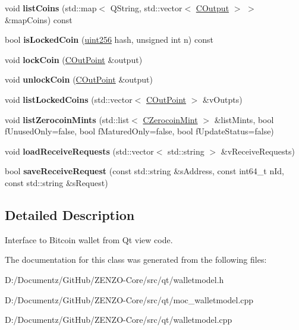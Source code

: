 \begin{DoxyCompactItemize}
void {\bfseries list\+Coins} (std\+::map$<$ Q\+String, std\+::vector$<$ \mbox{\hyperlink{class_c_output}{C\+Output}} $>$ $>$ \&map\+Coins) const
\item 
\mbox{\label{class_wallet_model_abeea7ae42ec38ace2786b2e3d340f5a2}} 
bool {\bfseries is\+Locked\+Coin} (\mbox{\hyperlink{classuint256}{uint256}} hash, unsigned int n) const
\item 
\mbox{\label{class_wallet_model_a9bb6c954dc3cf27e25ced65375fa02f0}} 
void {\bfseries lock\+Coin} (\mbox{\hyperlink{class_c_out_point}{C\+Out\+Point}} \&output)
\item 
\mbox{\label{class_wallet_model_a0a5514bd400327df0f7d63341d8fabf4}} 
void {\bfseries unlock\+Coin} (\mbox{\hyperlink{class_c_out_point}{C\+Out\+Point}} \&output)
\item 
\mbox{\label{class_wallet_model_a367977352d1ef183ec2cb6b508a85bc2}} 
void {\bfseries list\+Locked\+Coins} (std\+::vector$<$ \mbox{\hyperlink{class_c_out_point}{C\+Out\+Point}} $>$ \&v\+Outpts)
\item 
\mbox{\label{class_wallet_model_a901e0b3c32c39bd3301d90f05255f442}} 
void {\bfseries list\+Zerocoin\+Mints} (std\+::list$<$ \mbox{\hyperlink{class_c_zerocoin_mint}{C\+Zerocoin\+Mint}} $>$ \&list\+Mints, bool f\+Unused\+Only=false, bool f\+Matured\+Only=false, bool f\+Update\+Status=false)
\item 
\mbox{\label{class_wallet_model_a0ec10fbe74317b1949ac4ae63451d115}} 
void {\bfseries load\+Receive\+Requests} (std\+::vector$<$ std\+::string $>$ \&v\+Receive\+Requests)
\item 
\mbox{\label{class_wallet_model_a88d44bc0994c1701386f63b1f266637f}} 
bool {\bfseries save\+Receive\+Request} (const std\+::string \&s\+Address, const int64\+\_\+t n\+Id, const std\+::string \&s\+Request)
\end{DoxyCompactItemize}


\subsection{Detailed Description}
Interface to Bitcoin wallet from Qt view code. 

The documentation for this class was generated from the following files\+:\begin{DoxyCompactItemize}
\item 
D\+:/\+Documentz/\+Git\+Hub/\+Z\+E\+N\+Z\+O-\/\+Core/src/qt/walletmodel.\+h\item 
D\+:/\+Documentz/\+Git\+Hub/\+Z\+E\+N\+Z\+O-\/\+Core/src/qt/moc\+\_\+walletmodel.\+cpp\item 
D\+:/\+Documentz/\+Git\+Hub/\+Z\+E\+N\+Z\+O-\/\+Core/src/qt/walletmodel.\+cpp\end{DoxyCompactItemize}
